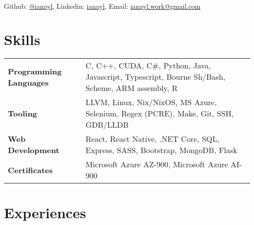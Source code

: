 \documentclass[9pt]{article}
\author{Ian Li}
\makeatletter
\renewcommand{\maketitle}{
		\vspace{-8em}
    \begin{center}
		{\huge\bfseries
		\theauthor}
    \vspace{0.5em}
    \\
    Github: \href{https://github.com/ianayl}{@ianayl}, Linkedin: \href{https://www.linkedin.com/in/ianayl}{ianayl}, Email: \url{ianayl.work@gmail.com}
    \end{center}
    \vspace{-1.5em}
}
\makeatother
\begin{document}
\maketitle


\section{Skills}

\begin{tabular}{ l l }
    \textbf{Programming Languages} & C, C++, CUDA, C\#, Python, Java, Javascript, Typescript, Bourne Sh/Bash, Scheme, ARM assembly, R \\
    \textbf{Tooling} & LLVM, Linux, Nix/NixOS, MS Azure, Selenium, Regex (PCRE), Make, Git, SSH, GDB/LLDB \\
    \textbf{Web Development} & React, React Native, .NET Core, SQL, Express, SASS, Bootstrap, MongoDB, Flask \\
    \textbf{Certificates} & Microsoft Azure AZ-900, Microsoft Azure AI-900
\end{tabular}

\section*{Experiences}

\end{document}

